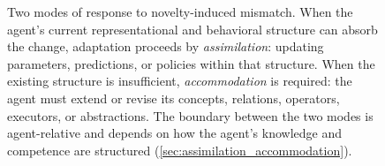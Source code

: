\begin{figure}[t]
{\begin{tikzpicture}
    \end{tikzpicture}%
    }
    \caption[Assimilation versus accommodation in response to mismatch]{Two modes of response to novelty-induced mismatch. When the agent's current representational and behavioral structure can absorb the change, adaptation proceeds by \emph{assimilation}: updating parameters, predictions, or policies within that structure. When the existing structure is insufficient, \emph{accommodation} is required: the agent must extend or revise its concepts, relations, operators, executors, or abstractions. The boundary between the two modes is agent-relative and depends on how the agent's knowledge and competence are structured (\cref{sec:assimilation_accommodation}).}
    \label{fig:assimilation_accommodation}
\end{figure}
